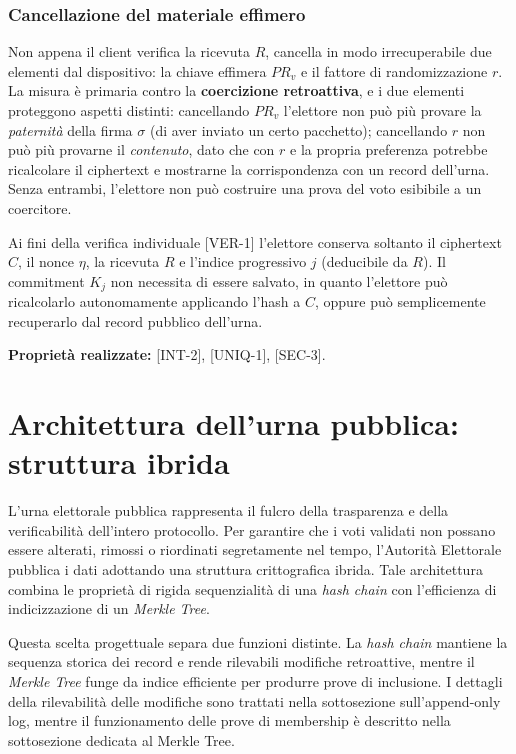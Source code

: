 \subsubsection{Cancellazione del materiale effimero}
\label{subsubsec:wp2_cancellazione_prv}

Non appena il client verifica la ricevuta $R$, cancella in modo irrecuperabile due elementi dal dispositivo: la chiave effimera $PR_v$ e il fattore di randomizzazione $r$. La misura è primaria contro la \textbf{coercizione retroattiva}, e i due elementi proteggono aspetti distinti: cancellando $PR_v$ l'elettore non può più provare la \textit{paternità} della firma $\sigma$ (di aver inviato un certo pacchetto); cancellando $r$ non può più provarne il \textit{contenuto}, dato che con $r$ e la propria preferenza potrebbe ricalcolare il ciphertext e mostrarne la corrispondenza con un record dell'urna. Senza entrambi, l'elettore non può costruire una prova del voto esibibile a un coercitore.

Ai fini della verifica individuale [VER-1] l'elettore conserva soltanto il ciphertext $C$, il nonce $\eta$, la ricevuta $R$ e l'indice progressivo $j$ (deducibile da $R$). Il commitment $K_j$ non necessita di essere salvato, in quanto l'elettore può ricalcolarlo autonomamente applicando l'hash a $C$, oppure può semplicemente recuperarlo dal record pubblico dell'urna.

\textbf{Proprietà realizzate:} [INT-2], [UNIQ-1], [SEC-3].


\section{Architettura dell'urna pubblica: struttura ibrida}
\label{sec:architettura_urna}

L'urna elettorale pubblica rappresenta il fulcro della trasparenza e della verificabilità dell'intero protocollo. Per garantire che i voti validati non possano essere alterati, rimossi o riordinati segretamente nel tempo, l'Autorità Elettorale pubblica i dati adottando una struttura crittografica ibrida. Tale architettura combina le proprietà di rigida sequenzialità di una \textit{hash chain} con l'efficienza di indicizzazione di un \textit{Merkle Tree}.

Questa scelta progettuale separa due funzioni distinte. La \textit{hash chain} mantiene la sequenza storica dei record e rende rilevabili modifiche retroattive, mentre il \textit{Merkle Tree} funge da indice efficiente per produrre prove di inclusione. I dettagli della rilevabilità delle modifiche sono trattati nella sottosezione sull'append-only log, mentre il funzionamento delle prove di membership è descritto nella sottosezione dedicata al Merkle Tree.


